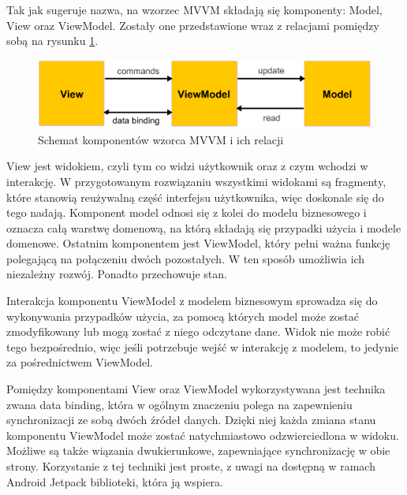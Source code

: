 Tak jak sugeruje nazwa, na wzorzec MVVM składają się komponenty: Model, View oraz ViewModel. Zostały one przedstawione wraz z relacjami pomiędzy sobą na rysunku \ref{fig:mvvm}.

\begin{figure}[ht!]
  \centering
  \includegraphics[width=\linewidth]{images/mvvm_general.png}
  \caption{Schemat komponentów wzorca MVVM i ich relacji}
  \label{fig:mvvm}
\end{figure}

View jest widokiem, czyli tym co widzi użytkownik oraz z czym wchodzi w interakcję. W przygotowanym rozwiązaniu wszystkimi widokami są fragmenty, które stanowią reużywalną część interfejsu użytkownika, więc doskonale się do tego nadają. Komponent model odnosi się z kolei do modelu biznesowego i oznacza całą warstwę domenową, na którą składają się przypadki użycia i modele domenowe. Ostatnim komponentem jest ViewModel, który pełni ważna funkcję polegającą na połączeniu dwóch pozostałych. W ten sposób umożliwia ich niezależny rozwój. Ponadto przechowuje stan.

Interakcja komponentu ViewModel z modelem biznesowym sprowadza się do wykonywania przypadków użycia, za pomocą których model może zostać zmodyfikowany lub mogą zostać z niego odczytane dane.
Widok nie może robić tego bezpośrednio, więc jeśli potrzebuje wejść w interakcję z modelem, to jedynie za pośrednictwem ViewModel.

Pomiędzy komponentami View oraz ViewModel wykorzystywana jest technika zwana data binding, która w ogólnym znaczeniu polega na zapewnieniu synchronizacji ze sobą dwóch źródeł danych. Dzięki niej każda zmiana stanu komponentu ViewModel może zostać natychmiastowo odzwierciedlona w widoku. Możliwe są także wiązania dwukierunkowe, zapewniające synchronizację w obie strony. Korzystanie z tej techniki jest proste, z uwagi na dostępną w ramach Android Jetpack biblioteki, która ją wspiera.





